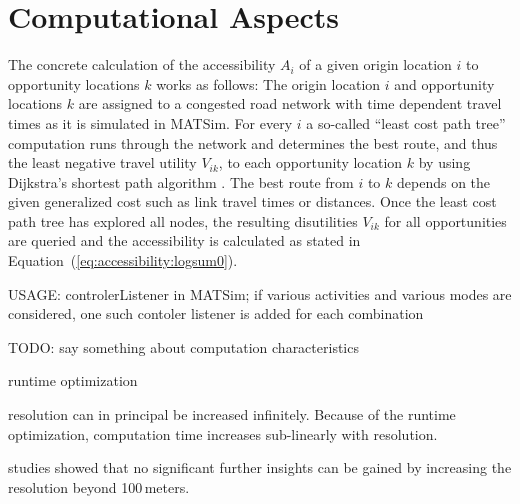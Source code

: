 


\section{Computational Aspects}

The concrete calculation of the accessibility $A_i$ of a given origin location $i$ to opportunity locations $k$ works as 
follows: The origin location $i$ and opportunity locations $k$ are assigned to a congested road network with time dependent 
travel times as it is simulated in MATSim. For every $i$ a so-called ``least cost path tree'' computation runs through the 
network and determines the best route, and thus the least negative travel utility $V_{ik}$, to each opportunity location 
$k$ by using Dijkstra's shortest path algorithm \citep{Dijkstra1959ShortestPath}. The best route from $i$ to $k$ depends 
on the given generalized cost such as link travel times or distances. Once the least cost path tree has explored all 
nodes, the resulting disutilities $V_{ik}$ for all opportunities are queried and the accessibility is calculated as 
stated in Equation~(\ref{eq:accessibility:logsum0}).


USAGE: controlerListener in MATSim; if various activities and various modes are considered, one such contoler listener 
is added for each combination


TODO: say something about computation characteristics

runtime optimization

resolution can in principal be increased infinitely. Because of the runtime optimization, computation time increases 
sub-linearly with resolution.

studies showed that no significant further insights can be gained by increasing the resolution beyond 100\,meters.

